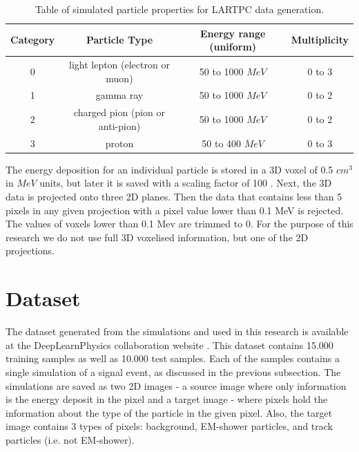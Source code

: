 \begin{table}[h]
\begin{center}
\begin{tabular}{ |c|c|c|c|}
\hline
Category & Particle Type & Energy range (uniform) & Multiplicity  \\
\hline
0 & light lepton (electron or muon) & 50 to 1000 $MeV$ & 0 to 3  \\
1 & gamma ray & 50 to 1000 $MeV$ & 0 to 2  \\
2 & charged pion (pion or anti-pion) & 50 to 1000 $MeV$ & 0 to 2  \\
3 & proton & 50 to 400 $MeV$ & 0 to 3  \\
\hline
\end{tabular}
\caption{\label{tab:sim_probs} Table of simulated particle properties for LARTPC data generation.}
\end{center}
\end{table}

The energy deposition for an individual particle is stored in a 3D voxel of 0.5 $cm^{3}$ in $MeV$ units, but later it is saved with a scaling factor of 100 \cite{dlp_tutorial}.
Next, the 3D data is projected onto three 2D planes.
Then the data that contains less than 5 pixels in any given projection with a pixel value lower than 0.1 MeV is rejected.
The values of voxels lower than 0.1 Mev are trimmed to 0.
For the purpose of this research we do not use full 3D voxelised information, but one of the 2D projections.


\section{Dataset}

The dataset generated from the simulations and used in this research is available at the DeepLearnPhysics collaboration website \cite{dlp_website}.
This dataset contains 15.000 training samples as well as 10.000 test samples.
Each of the samples contains a single simulation of a signal event, as discussed in the previous subsection. The simulations are saved as two 2D images - a source image where only information is the energy deposit in the pixel and a target image - where pixels hold the information about the type of the particle in the given pixel. Also, the target image contains 3 types of pixels: background, EM-shower particles, and track particles (i.e. not EM-shower).


